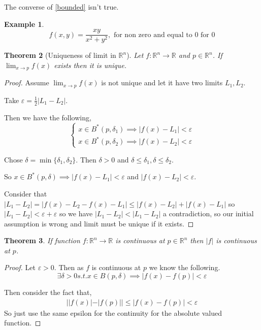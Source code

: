 \documentclass[oneside,11pt,pdftex]{book}%
\numberwithin{equation}{section}
\newtheorem{theorem}{Theorem}[chapter]%
\newtheorem{example}[theorem]{Example}
\numberwithin{section}{chapter}
\numberwithin{equation}{chapter}
\newcommand{\R}{\mathbb{R}}
\begin{document}
The converse of \ref{bounded} isn't true.
\begin{example}
	\[ f(x,y)=\frac{xy}{x^2+y^2}, \text{ for non zero and equal to 0 for 0}\]
\end{example}
\begin{theorem}[Uniqueness of limit in $ \R^n $]
	Let $ f: \R^n \rightarrow \R $ and $ p \in \R^n $. If $ \lim_{x\rightarrow p }f(x) $ exists then it is unique.
\end{theorem}
\begin{proof}
	Assume $ \lim_{x\rightarrow p} f(x) $ is not unique and let it have two limits $ L_1,L_2 $. 
	
	Take $ \varepsilon=\frac{1}{2} |L_1-L_2|$.
	
	Then we have the following,
	\[ \begin{cases}
		x \in B^*(p,\delta_1 ) \implies |f(x)-L_1|<\varepsilon\\
		x \in B^*(p,\delta_2 ) \implies |f(x)-L_2| < \varepsilon
	\end{cases} \]

	Chose $ \delta=\min\{\delta_1,\delta_2 \}.$ Then $ \delta>0 $ and $ \delta \leq \delta_1, \delta \leq \delta_2  $.
	
	So $ x \in B^*(p,\delta) \implies |f(x)-L_1|<\varepsilon $ and $ |f(x)-L_2|<\varepsilon $.
	
	Consider that $ |L_1-L_2|=|f(x)-L_2-f(x) -L_1| \leq |f(x)-L_2|+|f(x)-L_1|$ so $ |L_1-L_2|<\varepsilon+\varepsilon $ so we have $ |L_1-L_2|<|L_1-L_2| $ a contradiction, so our initial assumption is wrong and limit must be unique if it exists.
\end{proof}

\begin{theorem}
	If function $ f: \R^n \rightarrow \R  $ is continuous at $ p\in\R^n $ then $ |f| $ is continuous at $ p $.
\end{theorem}
\begin{proof}
	Let $ \varepsilon>0. $ Then as $ f $ is continuous at $ p $ we know the following.
	\[ \exists \delta>0 s.t. x\in B(p,\delta)\implies |f(x)-f(p)|<\varepsilon \]
	
	Then consider the fact that,
	\begin{align*}
		||f(x)|-|f(p)||\leq |f(x)-f(p)|<\varepsilon
	\end{align*}
	So just use the same epsilon for the continuity for the absolute valued function.
\end{proof}
\end{document}
